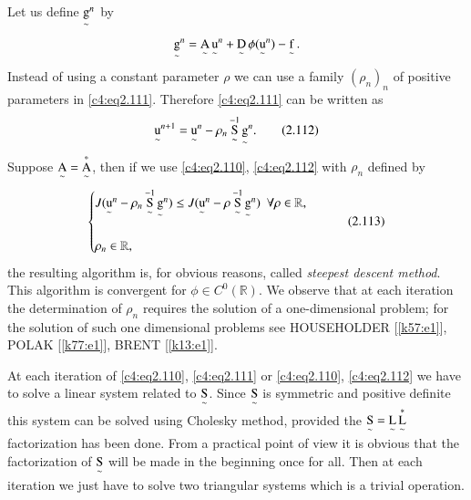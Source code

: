 \begin{remark}\label{c4:rem2.8}%
Let us define ${\operatorname*{g}\limits_\sim}^n$ by
$$
{\operatorname*{g}\limits_\sim}^n = \operatorname*{A}\limits_\sim {\operatorname*{u}\limits_\sim}^n + \operatorname*{D}\limits_\sim \phi 
({\operatorname*{u}\limits_\sim}^n) - \operatorname*{f}\limits_\sim.
$$
Instead of using a constant parameter $\rho$ we can use a family $(\rho_n)_n$ of positive parameters in 
\eqref{c4:eq2.111}. Therefore \eqref{c4:eq2.111} can be written as 
\begin{equation}
{\operatorname*{u}\limits_\sim}^{n+1}= {\operatorname*{u}\limits_\sim}^n -\rho_n
\operatorname*{S}\limits_\sim^{-1}{\operatorname*{g}\limits_\sim}^n.\tag{2.112}\label{c4:eq2.112}
\end{equation}
Suppose $\operatorname*{A}\limits_\sim = \operatorname*{A}\limits_\sim^*$, then if we use \eqref{c4:eq2.110}, 
\eqref{c4:eq2.112} with $\rho_n$ defined by 
\begin{equation}
\begin{cases}
J({\operatorname*{u}\limits_\sim}^n- \rho_n \operatorname*{S}\limits_\sim^{-1}{\operatorname*{g}\limits_\sim}^n)
\leq J({\operatorname*{u}\limits_\sim}^n - 
\rho \operatorname*{S}\limits_\sim^{-1}{\operatorname*{g}\limits_\sim}^n) ~~ \forall \rho \in \mathbb{R},\\
&\\
\rho_n \in \mathbb{R},
\end{cases} \tag{2.113}\label{c4:eq2.113}
\end{equation}\pageoriginale 
the resulting algorithm is, for obvious reasons, called
\textit{steepest descent method}. This algorithm is convergent for
$\phi \in C^0(\mathbb{R})$. We observe that at each iteration the
determination of $\rho_n$ requires the solution of a one-dimensional
problem; for the solution of such one dimensional problems see
HOUSEHOLDER [\ref{k57:e1}], POLAK [\ref{k77:e1}], BRENT [\ref{k13:e1}]. 
\end{remark}

\begin{remark}\label{c4:rem2.9}%
At each iteration of \eqref{c4:eq2.110}, \eqref{c4:eq2.111} or
\eqref{c4:eq2.110}, \eqref{c4:eq2.112} we have to solve a linear
system related to $\operatorname*{S}\limits_\sim$. Since $\operatorname*{S}\limits_\sim$ is
symmetric and positive definite this system can be solved using
Cholesky method, provided the $\operatorname*{S}\limits_\sim = \operatorname*{L}\limits_\sim 
\operatorname*{L}\limits_\sim^*$ factorization has been done. From a practical
point of view it is obvious that the factorization of $\operatorname*{S}\limits_\sim$
will be made in the beginning once for all. Then at each iteration we
just have to solve two triangular systems which is a trivial
operation. 
\end{remark}

